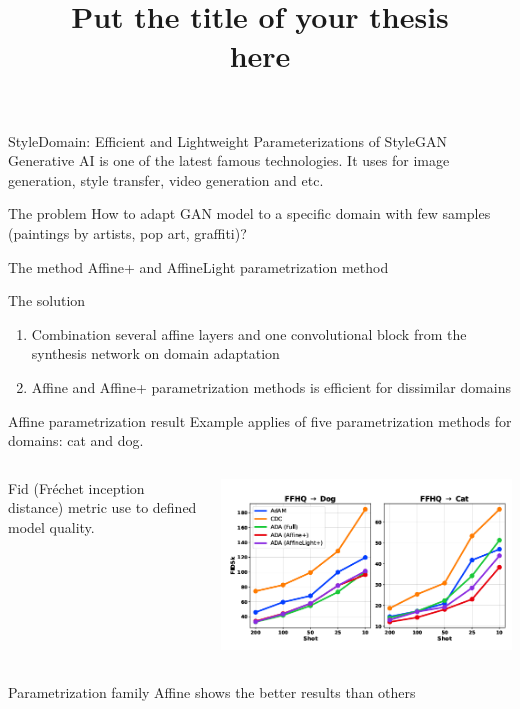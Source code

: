 \documentclass[12pt,pdf,hyperref={unicode}]{beamer}
\title{ Put the title of your thesis \\ here}
\begin{document}
\setcounter{page}{2}%
\begin{frame}{StyleDomain: Efficient and Lightweight Parameterizations of StyleGAN}
Generative AI is one of the latest famous technologies. It uses for image generation, style transfer, video generation and etc.
\begin{block}{The problem}
How to adapt GAN model to a specific domain with few samples (paintings by artists, pop art, graffiti)?
\end{block}
\begin{block}{The method}
Affine+ and AffineLight parametrization method
\end{block}
\begin{block}{The solution} 
\begin{enumerate}[1)]
\item Combination several affine layers and one convolutional block from the synthesis network on domain adaptation
\item Affine and Affine+ parametrization methods is efficient for dissimilar domains
\end{enumerate}
\end{block}
\end{frame}
\begin{frame}{Affine parametrization result}
Example applies of five parametrization methods for domains: cat and dog.
\begin{columns}
\begin{column}{0.3\textwidth}
Fid (Fréchet inception distance) metric use to defined model quality.
\end{column}
\begin{column}{0.7\textwidth}
	\includegraphics[width=1\textwidth]{ffhq_dataset_example_training}      
\end{column}
\end{columns}
\bigskip
Parametrization family Affine shows the better results than others
\end{frame}
\end{document}
